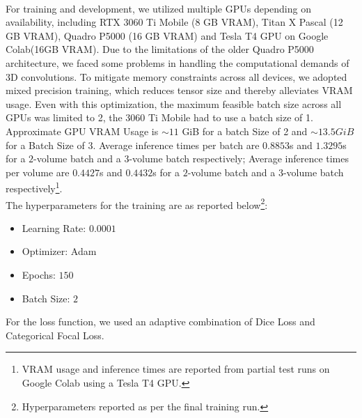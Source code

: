 \\
For training and development, we utilized multiple GPUs depending on availability, including RTX 3060 Ti Mobile (8 GB VRAM), Titan X Pascal (12 GB VRAM), Quadro P5000 (16 GB VRAM) and Tesla T4 GPU on Google Colab(16GB VRAM). Due to the limitations of the older Quadro P5000 architecture, we faced some problems in handling the computational demands of 3D convolutions. To mitigate memory constraints across all devices, we adopted mixed precision training, which reduces tensor size and thereby alleviates VRAM usage. Even with this optimization, the maximum feasible batch size across all GPUs was limited to 2, the 3060 Ti Mobile had to use a batch size of 1. Approximate GPU VRAM Usage is $\sim11$ GiB for a batch Size of 2 and $\sim13.5GiB$ for a Batch Size of $3$. Average inference times per batch are $0.8853$s and $1.3295$s for a $2$-volume batch and a $3$-volume batch respectively; Average inference times per volume are $0.4427$s and $0.4432$s for a $2$-volume batch and a $3$-volume batch respectively\footnote{VRAM usage and inference times are reported from partial test runs on Google Colab using a Tesla T4 GPU.}.
\\
The hyperparameters for the training are as reported below\footnote{Hyperparameters reported as per the final training run.}:
\begin{itemize}
    \item Learning Rate: $0.0001$
    \item Optimizer: Adam
    \item Epochs: $150$
    \item Batch Size: $2$
\end{itemize}

For the loss function, we used an adaptive combination of Dice Loss and Categorical Focal Loss.

